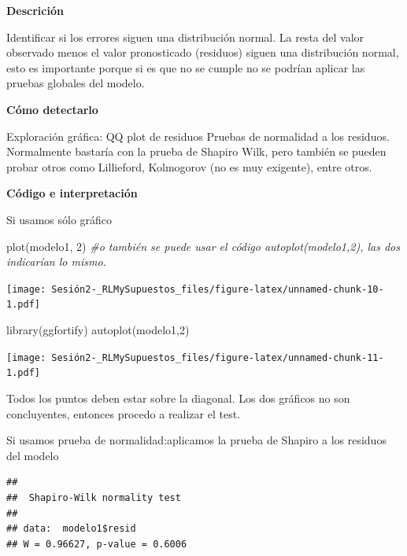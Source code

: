 \documentclass[
]{article}
\newenvironment{Shaded}{\begin{snugshade}}{\end{snugshade}}
\newcommand{\CommentTok}[1]{\textcolor[rgb]{0.56,0.35,0.01}{\textit{#1}}}
\newcommand{\DecValTok}[1]{\textcolor[rgb]{0.00,0.00,0.81}{#1}}
\newcommand{\FunctionTok}[1]{\textcolor[rgb]{0.00,0.00,0.00}{#1}}
\newcommand{\NormalTok}[1]{#1}
\newcommand{\SpecialCharTok}[1]{\textcolor[rgb]{0.00,0.00,0.00}{#1}}
\begin{document}
\textbf{Descrición}

Identificar si los errores siguen una distribución normal. La resta del
valor observado menos el valor pronosticado (residuos) siguen una
distribución normal, esto es importante porque si es que no se cumple no
se podrían aplicar las pruebas globales del modelo.

\textbf{Cómo detectarlo}

Exploración gráfica: QQ plot de residuos Pruebas de normalidad a los
residuos. Normalmente bastaría con la prueba de Shapiro Wilk, pero
también se pueden probar otros como Lillieford, Kolmogorov (no es muy
exigente), entre otros.

\textbf{Código e interpretación}

Si usamos sólo gráfico

\begin{Shaded}
\begin{Highlighting}[]
\FunctionTok{plot}\NormalTok{(modelo1, }\DecValTok{2}\NormalTok{) }\CommentTok{\#o también se puede usar el código autoplot(modelo1,2), las dos indicarían lo mismo.}
\end{Highlighting}
\end{Shaded}

\texttt{[image: Sesión2-\_RLMySupuestos\_files/figure-latex/unnamed-chunk-10-1.pdf]}

\begin{Shaded}
\begin{Highlighting}[]
\FunctionTok{library}\NormalTok{(ggfortify)}
\FunctionTok{autoplot}\NormalTok{(modelo1,}\DecValTok{2}\NormalTok{)}
\end{Highlighting}
\end{Shaded}

\texttt{[image: Sesión2-\_RLMySupuestos\_files/figure-latex/unnamed-chunk-11-1.pdf]}

Todos los puntos deben estar sobre la diagonal. Los dos gráficos no son
concluyentes, entonces procedo a realizar el test.

Si usamos prueba de normalidad:aplicamos la prueba de Shapiro a los
residuos del modelo

\begin{Shaded}
\end{Shaded}

\begin{verbatim}
## 
##  Shapiro-Wilk normality test
## 
## data:  modelo1$resid
## W = 0.96627, p-value = 0.6006
\end{verbatim}
\end{document}
